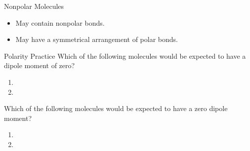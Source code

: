 \documentclass[notes=onlyslideswithnotes,notes=hide]{beamer}
\begin{document}
\begin{frame}{Nonpolar Molecules}
	\begin{itemize}
		\item \alert{May} contain \alert{nonpolar} bonds.

			\begin{center}
				\hspace{5em}
			\end{center}

		\item \alert{May} have a symmetrical arrangement of polar bonds.

			\bigskip

			\begin{center}
				\hspace{5em}
			\end{center}
	\end{itemize}
\end{frame}

\begin{frame}[t]{Polarity Practice}
	Which of the following molecules would be expected to have a dipole
	moment of zero?

	\begin{enumerate}
		\item {}
		\item {}
	\end{enumerate}
	
	\vspace{8em}
\end{frame}

\begin{onyourown}
	Which of the following molecules would be expected to have a zero dipole
	moment?

	\begin{enumerate}
		\item {}
		\item {}
	\end{enumerate}
\end{onyourown}
\end{document}
